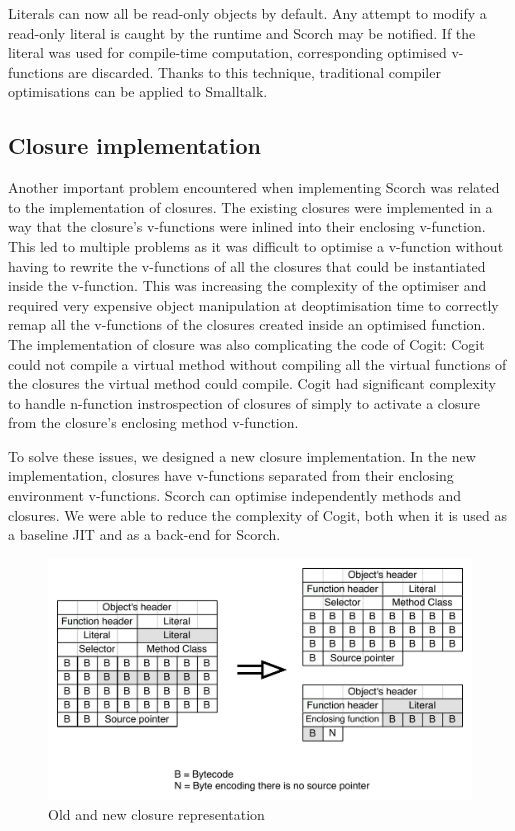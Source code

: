 \documentclass[a4paper,12pt,twoside]{../includes/ThesisStyle}
\begin{document}
Literals can now all be read-only objects by default. Any attempt to modify a read-only literal is caught by the runtime and Scorch may be notified. If the literal was used for compile-time computation, corresponding optimised v-functions are discarded. Thanks to this technique, traditional compiler optimisations can be applied to Smalltalk.

\subsection{Closure implementation}

Another important problem encountered when implementing Scorch was related to the implementation of closures. The existing closures were implemented in a way that the closure's v-functions were inlined into their enclosing v-function. This led to multiple problems as it was difficult to optimise a v-function without having to rewrite the v-functions of all the closures that could be instantiated inside the v-function. This was increasing the complexity of the optimiser and required very expensive object manipulation at deoptimisation time to correctly remap all the v-functions of the closures created inside an optimised function. The implementation of closure was also complicating the code of Cogit: Cogit could not compile a virtual method without compiling all the virtual functions of the closures the virtual method could compile. Cogit had significant complexity to handle n-function instrospection of closures of simply to activate a closure from the closure's enclosing method v-function.

To solve these issues, we designed a new closure implementation. In the new implementation, closures have v-functions separated from their enclosing environment v-functions. Scorch can optimise independently methods and closures. We were able to reduce the complexity of Cogit, both when it is used as a baseline JIT and as a back-end for Scorch.

\begin{figure}[h!]
    \begin{center}
        \includegraphics[width=0.85\linewidth]{CompiledBlock}
        \caption{Old and new closure representation}
        \label{fig:CompiledBlock}
    \end{center}
\end{figure}
\end{document}

